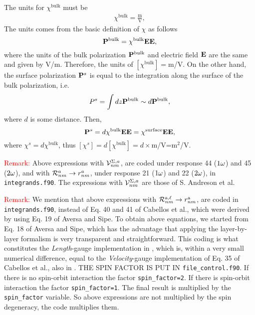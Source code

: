 The units  for $\chi^{\text{bulk}}$ must be
\begin{align}\label{units.2}
\chi^{\text{bulk}}=\frac{\text{m}}{\text{V}} 
,
\end{align} 
The units comes from the basic definition of $\chi$ as follows
\begin{equation}\label{u.1}
\mathbf{P}^{\text{bulk}}=\chi^{\text{bulk}}\mathbf{E}\mathbf{E}
,
\end{equation}
where the units of the bulk polarization $\mathbf{P}^{\text{bulk}}$
 and electric field $\mathbf{E}$
are the same and given by V/m. Therefore, the units of 
$[\chi^{\text{bulk}}]=$m/V.
On the other hand,
the surface polarization $\mathbf{P}^s$ is equal to the integration along the surface of      
the bulk polarization, i.e.                                                      
\begin{equation}\label{u.2.chis} 
P^s=\int dz \mathbf{P}^{\text{bulk}}\sim d \mathbf{P}^{\text{bulk}}                                             
,
\end{equation} 
where $d$ is some distance. Then,                                                  
\begin{equation}\label{u.3.chis}
\mathbf{P}^s=d \chi^{\text{bulk}}\mathbf{E}\mathbf{E}                                             
=\chi^{\text{surface}}\mathbf{E}\mathbf{E}                                             
,
\end{equation}
where $\chi^s=d\chi^{\text{bulk}}$,
thus
$[\chi^s]=d[\chi^{\text{bulk}}]=d\times$m/V=m$^2$/V.                                                             

\textcolor{red}{Remark:}  
Above expressions with ${\cal V}^{\Sigma,a}_{nm}$,
are coded under response 44 ($1\omega$) and 45 ($2\omega$), and with
${\cal R}^{a}_{nm}\to r^a_{nm}$,
under response 21 ($1\omega$) and 22 ($2\omega$), in 
\verb=integrands.f90=. 
The expressions with ${\cal V}^{\Sigma,a}_{nm}$ are those of 
S. Andreson et al.\cite{andersonPRB15} 

\textcolor{red}{Remark:} We mention that above expressions with 
${\cal R}^{\mathrm{a},\ell}_{nm}\to r^{\mathrm{a}}_{nm}$, are coded in
\verb=integrands.f90=, instead of Eq. 40 and 41 of Cabellos et
al.\cite{cabellosPRB09}, which were derived by using Eq. 19 of Aversa
and Sipe.\cite{aversaPRB95} To obtain above equations, we started
from Eq. 18 of Aversa and Sipe,\cite{aversaPRB95} which has the
advantage that applying the layer-by-layer formalism is very
transparent and straightforward. This coding is what constitutes the
{\it Length}-gauge implementation in \tiniba, which is, within a very
small numerical difference, equal to the {\it Velocity}-gauge
implementation of Eq. 35 of Cabellos et al.\cite{cabellosPRB09}, also
in \tiniba. 
{\color{red} THE SPIN FACTOR IS PUT IN
}\verb=file_control.f90=. 
If there is no spin-orbit interaction the 
factor \Verb+spin_factor=2+.  
If there is spin-orbit interaction the 
factor \Verb+spin_factor=1+. The final result is multiplied by  
the \verb=spin_factor= variable. So above expressions are not
multiplied by the spin degeneracy, the code multiplies them.   
